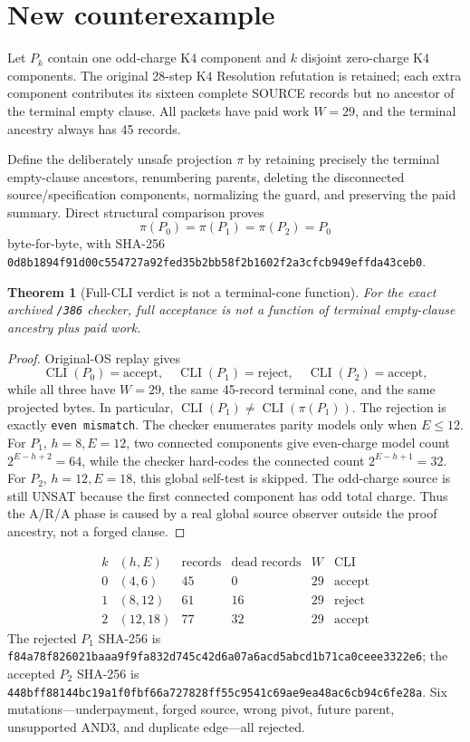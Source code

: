 \documentclass[11pt]{article}
\newtheorem{theorem}{Theorem}
\begin{document}
\section*{New counterexample}
Let \(P_k\) contain one odd-charge K4 component and \(k\) disjoint zero-charge K4 components.
The original 28-step K4 Resolution refutation is retained; each extra component contributes its sixteen complete SOURCE records but no ancestor of the terminal empty clause.
All packets have paid work \(W=29\), and the terminal ancestry always has 45 records.

Define the deliberately unsafe projection \(\pi\) by retaining precisely the terminal empty-clause ancestors, renumbering parents, deleting the disconnected source/specification components, normalizing the guard, and preserving the paid summary.
Direct structural comparison proves
\[
 \pi(P_0)=\pi(P_1)=\pi(P_2)=P_0
\]
byte-for-byte, with SHA-256
\texttt{0d8b1894f91d00c554727a92fed35b2bb58f2b1602f2a3cfcb949effda43ceb0}.

\begin{theorem}[Full-CLI verdict is not a terminal-cone function]
For the exact archived \texttt{/386} checker, full acceptance is not a function of terminal empty-clause ancestry plus paid work.
\end{theorem}

\begin{proof}
Original-OS replay gives
\[
 \operatorname{CLI}(P_0)=\mathrm{accept},\quad
 \operatorname{CLI}(P_1)=\mathrm{reject},\quad
 \operatorname{CLI}(P_2)=\mathrm{accept},
\]
while all three have \(W=29\), the same 45-record terminal cone, and the same projected bytes.
In particular, \(\operatorname{CLI}(P_1)\ne\operatorname{CLI}(\pi(P_1))\).
The rejection is exactly \texttt{even mismatch}.
The checker enumerates parity models only when \(E\le12\).
For \(P_1\), \(h=8,E=12\), two connected components give even-charge model count \(2^{E-h+2}=64\), while the checker hard-codes the connected count \(2^{E-h+1}=32\).
For \(P_2\), \(h=12,E=18\), this global self-test is skipped.
The odd-charge source is still UNSAT because the first connected component has odd total charge.
Thus the A/R/A phase is caused by a real global source observer outside the proof ancestry, not a forged clause.
\end{proof}

\[
\begin{array}{c|c|c|c|c|c}
k & (h,E) & \text{records} & \text{dead records} & W & \text{CLI}\\\hline
0&(4,6)&45&0&29&\mathrm{accept}\\
1&(8,12)&61&16&29&\mathrm{reject}\\
2&(12,18)&77&32&29&\mathrm{accept}
\end{array}
\]
The rejected \(P_1\) SHA-256 is \texttt{f84a78f826021baaa9f9fa832d745c42d6a07a6acd5abcd1b71ca0ceee3322e6};
the accepted \(P_2\) SHA-256 is \texttt{448bff88144bc19a1f0fbf66a727828ff55c9541c69ae9ea48ac6cb94c6fe28a}.
Six mutations---underpayment, forged source, wrong pivot, future parent, unsupported AND3, and duplicate edge---all rejected.
\end{document}
